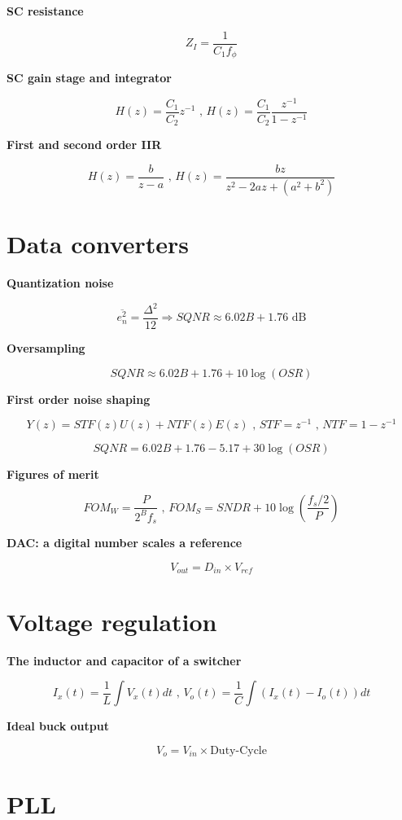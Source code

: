 \textbf{SC resistance}

\[ Z_{I} = \frac{1}{C_1 f_\phi} \]

\textbf{SC gain stage and integrator}

\[ H(z) = \frac{C_1}{C_2}z^{-1} \text{ , } H(z) = \frac{C_1}{C_2}\frac{z^{-1}}{1 - z^{-1}} \]

\textbf{First and second order IIR}

\[ H(z) = \frac{b}{z-a} \text{ , } H(z) = \frac{b z}{z^2 - 2a z + (a^2+b^2)} \]

\section{Data converters}\label{data-converters}

\textbf{Quantization noise}

\[ \overline{e_n^2} = \frac{\Delta^2}{12} \Rightarrow SQNR \approx 6.02B + 1.76 \text{ dB} \]

\textbf{Oversampling}

\[ SQNR \approx 6.02B + 1.76 + 10\log(OSR) \]

\textbf{First order noise shaping}

\[ Y(z) = STF(z)U(z) + NTF(z)E(z) \text{ , } STF = z^{-1} \text{ , } NTF = 1 - z^{-1} \]

\[ SQNR = 6.02B + 1.76 - 5.17 + 30\log(OSR) \]

\textbf{Figures of merit}

\[ FOM_W = \frac{P}{2^B f_s} \text{ , } FOM_S = SNDR + 10\log\left(\frac{f_s/2}{P}\right) \]

\textbf{DAC: a digital number scales a reference}

\[ V_{out} = D_{in} \times V_{ref} \]

\section{Voltage regulation}\label{voltage-regulation}

\textbf{The inductor and capacitor of a switcher}

\[ I_x(t) = \frac{1}{L}\int{V_x(t)dt} \text{ , } V_o(t) = \frac{1}{C}\int{(I_x(t) - I_o(t))dt} \]

\textbf{Ideal buck output}

\[ V_o = V_{in} \times \text{Duty-Cycle} \]

\section{PLL}\label{pll}

